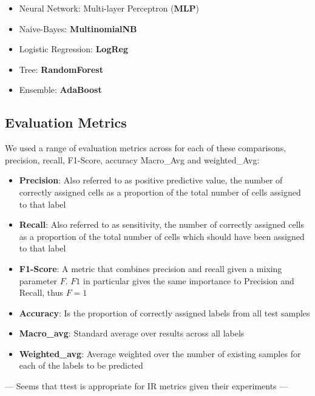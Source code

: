 \documentclass[10.7pt,]{article}
\begin{document}
\begin{itemize}
	\item Neural Network: Multi-layer Perceptron (\textbf{MLP})
	\item Naive-Bayes: \textbf{MultinomialNB}
	\item Logistic Regression: \textbf{LogReg}
	\item Tree: \textbf{RandomForest}
	\item Ensemble: \textbf{AdaBoost}
\end{itemize}

\subsection{Evaluation Metrics} \label{measures}
We used a range of evaluation metrics across for each of these comparisons, precision, recall, F1-Score, accuracy Macro\_Avg and weighted\_Avg:

\begin{itemize}
	\item \textbf{Precision}: Also referred to as positive predictive value, the number of correctly assigned cells as a proportion of the total number of cells assigned to that label  %
	\item \textbf{Recall}: Also referred to as sensitivity, the number of correctly assigned cells as a proportion of the total number of cells which should have been assigned to that label  %
	\item \textbf{F1-Score}: A metric that combines precision and recall given a mixing parameter $ F $. $ F1 $ in particular gives the same importance to Precision and Recall, thus $F=1$
	\item \textbf{Accuracy}: Is the proportion of correctly assigned labels from all test samples
	\item \textbf{Macro\_avg}: Standard average over results across all labels
	\item \textbf{Weighted\_avg}: Average weighted over the number of existing samples for each of the labels to be predicted
\end{itemize}

--- Seems \cite{urbano2019statistical} that ttest is appropriate for IR metrics given their experiments ---
\end{document}

